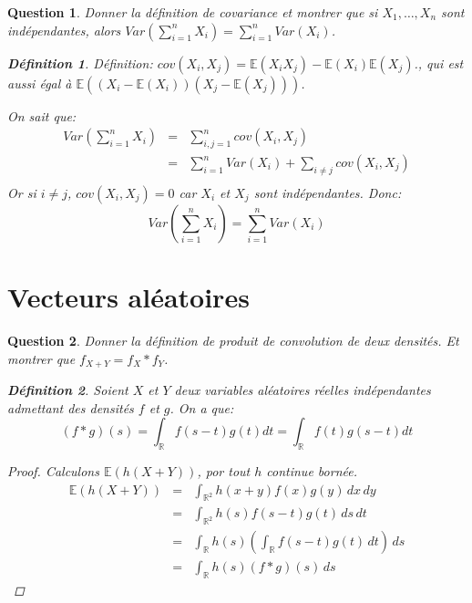 \documentclass{article}
\theoremstyle{plain}
\newtheorem{question}{Question}
\theoremstyle{definition}
\newtheorem{definition}{Définition}
\begin{document}
\begin{question}
	Donner la définition de covariance et montrer que si $X_1, \dots, X_n$ sont indépendantes, alors $Var(\sum_{i=1}^n X_i) = \sum_{i=1}^n Var(X_i)$.
	\begin{definition}
		Définition: $cov(X_i, X_j) = \mathbb{E} (X_iX_j) - \mathbb{E} (X_i) \mathbb{E} (X_j)$., qui est aussi égal à $\mathbb{E} ((X_i - \mathbb{E} (X_i))(X_j - \mathbb{E} (X_j)))$.

		On sait que:
		\begin{eqnarray*}
			Var(\sum_{i=1}^n X_i) &=& \sum_{i,j=1}^n cov(X_i, X_j) \\
			&=& \sum_{i=1}^n Var(X_i) + \sum_{i \neq j} cov(X_i, X_j) \\
		\end{eqnarray*}
		Or si $i \neq j$, $cov(X_i, X_j) = 0$ car $X_i$ et $X_j$ sont indépendantes. Donc:
		\begin{equation*}
			Var(\sum_{i=1}^n X_i) = \sum_{i=1}^n Var(X_i)
		\end{equation*}
	\end{definition}
\end{question}

\section{Vecteurs aléatoires}

\begin{question}
	Donner la définition de produit de convolution de deux densités. Et montrer que
	$f_{X+Y} = f_X * f_Y$.
	\begin{definition}
		Soient $X$ et $Y$ deux variables aléatoires réelles indépendantes admettant des densités $f$ et $g$.
		On a que:
		\begin{equation*}
			(f * g)(s) = \int_{\mathbb{R}} f (s - t)g(t) dt = \int_{\mathbb{R}} f (t)g(s - t) dt
		\end{equation*}
	\end{definition}
	\begin{proof}
		Calculons $\mathbb{E}(h(X+Y))$, por tout $h$ continue bornée.
		\begin{eqnarray*}
			\mathbb{E}(h(X+Y)) &=& \int_{\mathbb{R}^2} h(x + y) f(x)g(y)\, dx \, dy \\
			&=& \int_{\mathbb{R}^2} h(s) f(s - t)g(t)\, ds \, dt \\
			&=& \int_{\mathbb{R}} h(s) \left( \int_{\mathbb{R}}  f(s-t)g(t)\, dt \right)\, ds \\
			&=& \int_{\mathbb{R}} h(s) (f * g)(s)\, ds
		\end{eqnarray*}
	\end{proof}
\end{question}
\end{document}
